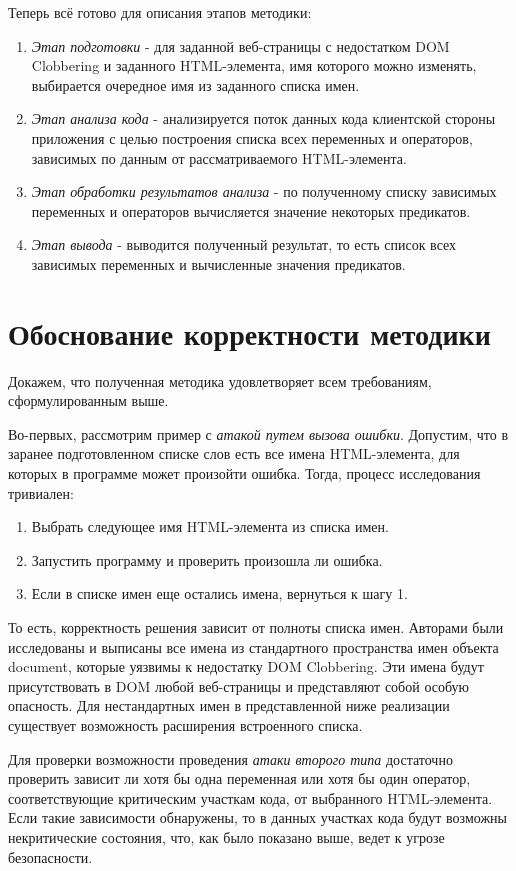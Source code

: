 Теперь всё готово для описания этапов методики:
\begin{enumerate}
	\item \textit{Этап подготовки} - для заданной веб-страницы с недостатком DOM Clob\-bering и заданного HTML-элемента, имя которого можно изменять, выбирается очередное имя из заданного списка имен.
	\item \textit{Этап анализа кода} - анализируется поток данных кода клиентской стороны приложения с целью построения списка всех переменных и операторов, зависимых по данным от рассматриваемого HTML-элемента.
	\item \textit{Этап обработки результатов анализа} - по полученному списку зависимых переменных и операторов вычисляется значение некоторых предикатов.
	\item \textit{Этап вывода} - выводится полученный результат, то есть список всех зависимых переменных и вычисленные значения предикатов.
\end{enumerate}
\bigskip

\section{Обоснование корректности методики}
Докажем, что полученная методика удовлетворяет всем требованиям, сформулированным выше.


Во-первых, рассмотрим пример с \textit{атакой путем вызова ошибки}. Допустим, что в заранее подготовленном списке слов есть все имена HTML-элемента, для которых в программе может произойти ошибка. Тогда, процесс исследования тривиален: 
\begin{enumerate}
	\item Выбрать следующее имя HTML-элемента из списка имен.
	\item Запустить программу и проверить произошла ли ошибка.
	\item Если в списке имен еще остались имена, вернуться к шагу 1.
\end{enumerate}
То есть, корректность решения зависит от полноты списка имен. Авторами были исследованы и выписаны все имена из стандартного пространства имен объекта document, которые уязвимы к недостатку DOM Clobbering. Эти имена будут присутствовать в DOM любой веб-страницы и представляют собой особую опасность. Для нестандартных имен в представленной ниже реализации существует возможность расширения встроенного списка.

\bigskip
Для проверки возможности проведения \textit{атаки второго типа} достаточно проверить зависит ли хотя бы одна переменная или хотя бы один оператор, соответствующие критическим участкам кода, от выбранного HTML-элемента. Если такие зависимости обнаружены, то в данных участках кода будут возможны некритические состояния, что, как было показано выше, ведет к угрозе безопасности.

